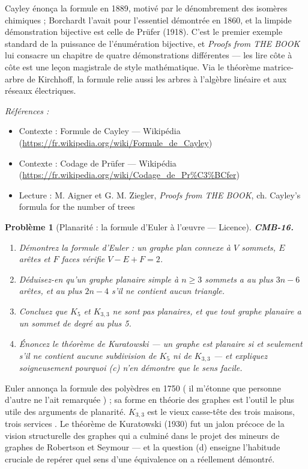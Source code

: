 \documentclass[11pt]{article}
\newtheorem{problem}{Problème}
\newenvironment{refs}{\par\small\noindent\emph{Références :}\begin{itemize}\setlength\itemsep{0pt}}{\end{itemize}\normalsize}
\begin{document}
\noindent Cayley énonça la formule en 1889, motivé par le dénombrement des isomères
chimiques ; Borchardt l'avait pour l'essentiel démontrée en 1860, et la limpide démonstration
bijective est celle de Prüfer (1918). C'est le premier exemple standard de la puissance de
l'énumération bijective, et \textit{Proofs from THE BOOK} lui consacre un chapitre de quatre
démonstrations différentes --- les lire côte à côte est une leçon magistrale de style mathématique.
Via le théorème matrice-arbre de Kirchhoff, la formule relie aussi les arbres à l'algèbre linéaire
et aux réseaux électriques.

\begin{refs}
\item Contexte : Formule de Cayley --- Wikipédia (\url{https://fr.wikipedia.org/wiki/Formule_de_Cayley})
\item Contexte : Codage de Prüfer --- Wikipédia (\url{https://fr.wikipedia.org/wiki/Codage_de_Pr%C3%BCfer})
\item Lecture : M. Aigner et G. M. Ziegler, \textit{Proofs from THE BOOK}, ch. \og{} Cayley's formula for the number of trees \fg{}
\end{refs}

\bigskip

\begin{problem}[{Planarité : la formule d'Euler à l'\oe{}uvre --- Licence}]
\textbf{CMB-16.} \begin{enumerate}
\item[(a)] Démontrez la formule d'Euler : un graphe plan connexe à $ V $ sommets, $ E $ arêtes et
$ F $ faces vérifie $ V - E + F = 2 $.
\item[(b)] Déduisez-en qu'un graphe planaire simple à $ n \ge 3 $ sommets a au plus $ 3n - 6 $
arêtes, et au plus $ 2n - 4 $ s'il ne contient aucun triangle.
\item[(c)] Concluez que $ K_5 $ et $ K_{3,3} $ ne sont pas planaires, et que tout graphe planaire a
un sommet de degré au plus 5.
\item[(d)] Énoncez le théorème de Kuratowski --- un graphe est planaire si et seulement s'il ne contient
aucune subdivision de $ K_5 $ ni de $ K_{3,3} $ --- et expliquez soigneusement pourquoi (c) n'en
démontre que le sens facile.
\end{enumerate}

\end{problem}

\noindent Euler annonça la formule des polyèdres en 1750 (\og{} il m'étonne que personne
d'autre ne l'ait remarquée \fg{}) ; sa forme en théorie des graphes est l'outil le plus utile des
arguments de planarité. $ K_{3,3} $ est le vieux casse-tête des \og{} trois maisons, trois
services \fg{}. Le théorème de Kuratowski (1930) fut un jalon précoce de la vision structurelle des
graphes qui a culminé dans le projet des mineurs de graphes de Robertson et Seymour --- et la
question (d) enseigne l'habitude cruciale de repérer quel sens d'une équivalence on a réellement
démontré.
\end{document}
